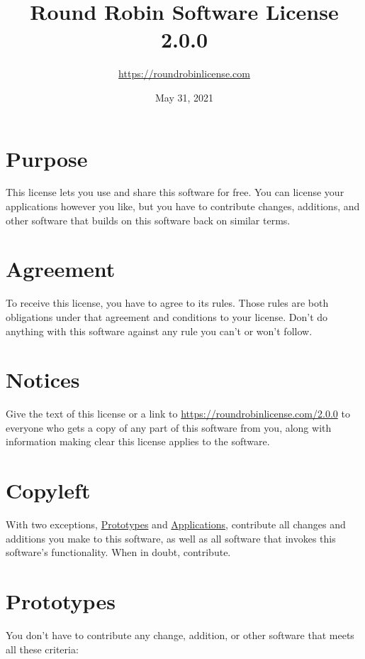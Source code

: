 \documentclass[12pt,letterpaper]{article}
\title{\textbf{Round Robin Software License 2.0.0}}
\author{\url{https://roundrobinlicense.com}}
\date{May 31, 2021}
\begin{document}
\maketitle

\section*{Purpose}

This license lets you use and share this software for free. You can license your applications however you like, but you have to contribute changes, additions, and other software that builds on this software back on similar terms.

\section*{Agreement}

To receive this license, you have to agree to its rules. Those rules are both obligations under that agreement and conditions to your license. Don't do anything with this software against any rule you can't or won't follow.

\hypertarget{Notices}{\section*{Notices}}

Give the text of this license or a link to \url{https://roundrobinlicense.com/2.0.0} to everyone who gets a copy of any part of this software from you, along with information making clear this license applies to the software.

\hypertarget{Copyleft}{\section*{Copyleft}}

With two exceptions, \hyperlink{Prototypes}{Prototypes} and \hyperlink{Applications}{Applications}, contribute all changes and additions you make to this software, as well as all software that invokes this software's functionality. When in doubt, contribute.

\hypertarget{Prototypes}{\section*{Prototypes}}

You don't have to contribute any change, addition, or other software that meets all these criteria:
\end{document}
